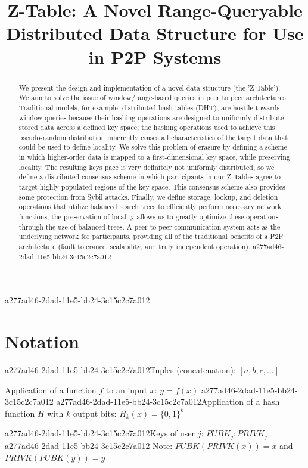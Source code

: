 \documentclass[12pt]{article}
\title{Z-Table: A Novel Range-Queryable Distributed Data Structure for Use in P2P Systems}
\begin{document}
\maketitle

a277ad46-2dad-11e5-bb24-3c15c2c7a012\begin{abstract}
We present the design and implementation of a novel data structure (the 'Z-Table'). We aim to solve the issue of window/range-based queries in peer to peer architectures. Traditional models, for example,  distributed hash tables (DHT), are hostile towards window queries because their hashing operations are designed to uniformly distribute stored data across a defined key space; the hashing operations used to achieve this pseudo-random distribution inherently erases all characteristics of the target data that could be used to define locality. We solve this problem of erasure by defining a scheme in which higher-order data is mapped to a first-dimensional key space, while preserving locality. The resulting keys pace is very definitely not uniformly distributed, so we define a distributed consensus scheme in which participants in our Z-Tables agree to target highly populated regions of the key space. This consensus scheme also provides some protection from Sybil attacks. Finally, we define storage, lookup, and deletion operations that utilize balanced search trees to efficiently perform necessary network functions; the preservation of locality allows us to greatly optimize these operations through the use of balanced trees. A peer to peer communication system acts as the underlying network for participants, providing all of the traditional benefits of a P2P architecture (fault tolerance, scalability, and truly independent operation).
a277ad46-2dad-11e5-bb24-3c15c2c7a012\end{abstract}

\section{Notation}

a277ad46-2dad-11e5-bb24-3c15c2c7a012Tuples (concatenation): $[a,b,c,...]$

Application of a function $f$ to an input $x$: $y=f(x)$
a277ad46-2dad-11e5-bb24-3c15c2c7a012
a277ad46-2dad-11e5-bb24-3c15c2c7a012Application of a hash function $H$ with $k$ output bits: $H_{k}(x) = \{0,1\}^k$

a277ad46-2dad-11e5-bb24-3c15c2c7a012Keys of user $j$: $ PUBK_j; PRIVK_j $
a277ad46-2dad-11e5-bb24-3c15c2c7a012
Note: $PUBK(PRIVK(x)) = x$ and $PRIVK(PUBK(y)) = y$~
\end{document}
